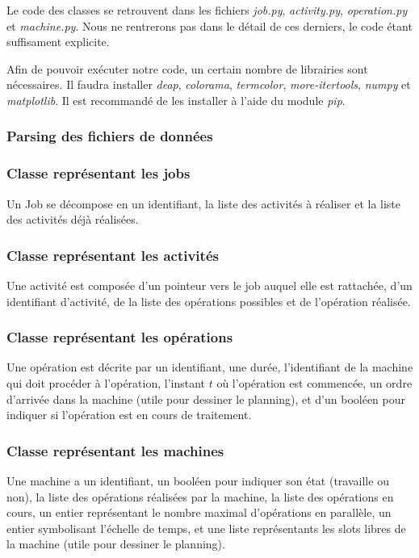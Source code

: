 Le code des classes se retrouvent dans les fichiers \textit{job.py}, \textit{activity.py}, \textit{operation.py} et \textit{machine.py}. Nous ne rentrerons pas dans le détail de ces derniers, le code étant suffisament explicite.

Afin de pouvoir exécuter notre code, un certain nombre de librairies sont nécessaires. Il faudra installer \textit{deap}, \textit{colorama}, \textit{termcolor}, \textit{more-itertools}, \textit{numpy} et \textit{matplotlib}. Il est recommandé de les installer à l'aide du module \textit{pip}.

\newpage

\subsubsection{Parsing des fichiers de données}



\subsubsection{Classe représentant les jobs}

Un Job se décompose en un identifiant, la liste des activités à réaliser et la liste des activités déjà réalisées.

\subsubsection{Classe représentant les activités}

Une activité est composée d'un pointeur vers le job auquel elle est rattachée, d'un identifiant d'activité, de la liste des opérations possibles et de l'opération réalisée.

\subsubsection{Classe représentant les opérations}

Une opération est décrite par un identifiant, une durée, l'identifiant de la machine qui doit procéder à l'opération, l'instant $t$ où l'opération est commencée, un ordre d'arrivée dans la machine (utile pour dessiner le planning), et d'un booléen pour indiquer si l'opération est en cours de traitement.

\subsubsection{Classe représentant les machines}

Une machine a un identifiant, un booléen pour indiquer son état (travaille ou non), la liste des opérations réalisées par la machine, la liste des opérations en cours, un entier représentant le nombre maximal d'opérations en parallèle, un entier symbolisant l'échelle de temps, et une liste représentants les slots libres de la machine (utile pour dessiner le planning).